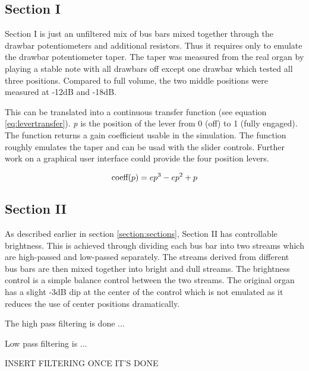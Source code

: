 \documentclass[11pt,a4paper]{article}
\begin{document}

\subsection{Section I}
\label{section:section-I}
Section I is just an unfiltered mix of bus bars mixed together through the drawbar potentiometers and additional resistors. Thus it requires only to emulate the drawbar potentiometer taper. The taper was measured from the real organ by playing a stable note with all drawbars off except one drawbar which tested all three positions. Compared to full volume, the two middle positions were measured at -12dB and -18dB.

This can be translated into a continuous transfer function (see equation \ref{eq:levertransfer}). \emph{p} is the position of the lever from 0 (off) to 1 (fully engaged). The function returns a gain coefficient usable in the simulation. The function roughly emulates the taper and can be usad with the slider controls. Further work on a graphical user interface could provide the four position levers.

\begin{equation}
\label{eq:levertransfer}
\mbox{coeff}(p) = e p^3 - e p^2 + p\\
\end{equation}



\subsection{Section II}

As described earlier in section \ref{section:sections}, Section II has controllable brightness. This is achieved through dividing each bus bar into two streams which are high-passed and low-passed separately. The streams derived from different bus bars are then mixed together into bright and dull streams. The brightness control is a simple balance control between the two streams. The original organ has a slight -3dB dip at the center of the control which is not emulated as it reduces the use of center positions dramatically.

The high pass filtering is done ...

Low pass filtering is ...

INSERT FILTERING ONCE IT'S DONE
\end{document}
